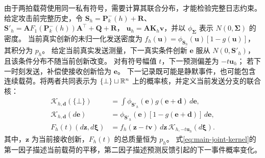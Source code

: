 由于两拍载荷使用同一私有符号，需要计算其联合分布，才能检验完整日志约束。
给定攻击前完整历史，令
${\bm{S}}_h={\bm{P}}_k^-(h)+{\bm{R}}$、${\bm{S}}'_h={\bm{A}}F_1({\bm{P}}_k^-(h)){\bm{A}}^\top+{\bm{Q}}+{\bm{R}}$，
${\bm{u}}_h={\bm{A}}{\bm{K}}_h{\bm{v}}$，并以 $\phi_{\bm{\Sigma}}$ 表示 $N(0,{\bm{\Sigma}})$ 的密度。
当前真实创新的未归一化发送密度为
$f_h({\bm{u}})=\phi_{{\bm{S}}_h}({\bm{u}})[1-g({\bm{u}})]$，其积分为 $p_h$。
给定当前真实发送测量，下一真实条件创新 ${\bm{e}}$ 服从 $N(0,{\bm{S}}'_h)$，
且该条件分布不随当前创新改变。
对有符号幅值 $t$，下一预测偏差为 $-t{\bm{u}}_h$；
若下一时刻发送，补偿使接收创新恰为 ${\bm{e}}$。
下一记录既可能是静默事件，也可能包含连续载荷。将两者共同表示为
$\{\bot\}\sqcup\mathbb R^n$ 上的概率核，并定义当前发送分支的联合核：
\begin{equation}
 \begin{aligned}
 \mathcal K_{h,{\bm{d}}}(\{\bot\})&=\int\phi_{{\bm{S}}'_h}({\bm{e}})g({\bm{e}}+{\bm{d}})\,d{\bm{e}},\\
 \mathcal K_{h,{\bm{d}}}(d{\bm{e}})&=\phi_{{\bm{S}}'_h}({\bm{e}})[1-g({\bm{e}}+{\bm{d}})]\,d{\bm{e}},\\
 F_h(t)(d{\bm{z}},d{\bm{\xi}})&=f_h({\bm{z}}-t{\bm{v}})\,d{\bm{z}}\,\mathcal K_{h,-t{\bm{u}}_h}(d{\bm{\xi}}).
 \end{aligned}
 \label{eq:main-joint-kernel}
\end{equation}
其中，${\bm{z}}$ 为当前接收创新，$F_h(t)$ 的总质量恒为 $p_h$。
式\eqref{eq:main-joint-kernel}的第一因子描述当前载荷的平移，第二因子描述预测反馈引起的下一事件概率变化。

